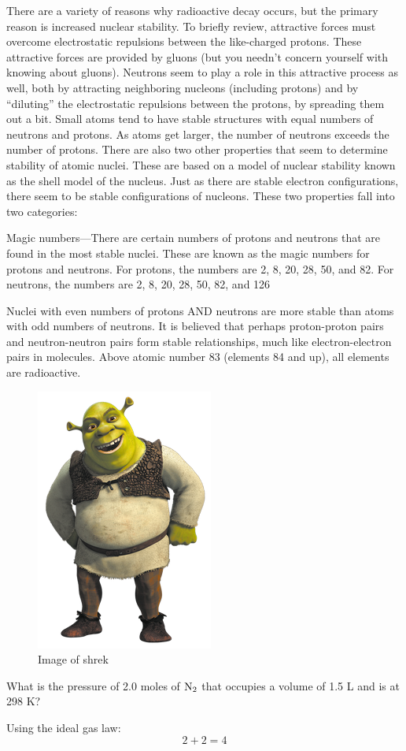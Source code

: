 There are a variety of reasons why radioactive decay occurs, but the primary reason is increased 
nuclear stability. To briefly review, attractive forces must overcome electrostatic repulsions 
between the like-charged protons. These attractive forces are provided by gluons (but you needn’t
concern yourself with knowing about gluons). Neutrons seem to play a role in this attractive 
process as well, both by attracting neighboring nucleons (including protons) and by “diluting” 
the electrostatic repulsions between the protons, by spreading them out a bit. Small atoms tend 
to have stable structures with equal numbers of neutrons and protons. As atoms get larger, the 
number of neutrons exceeds the number of protons. There are also two other properties that seem 
to determine stability of atomic nuclei. These are based on a model of nuclear stability known as 
the shell model of the nucleus. Just as there are stable electron configurations, there seem to be 
stable configurations of nucleons. These two properties fall into two categories:
\begin{enum}
    \item Magic numbers—There are certain numbers of protons and neutrons that are found in the 
        most stable nuclei. These are known as the magic numbers for protons and neutrons. For 
        protons, the numbers are 2, 8, 20, 28, 50, and 82. For neutrons, the numbers are 2, 8, 20,
        28, 50, 82, and 126
    \item Nuclei with even numbers of protons AND neutrons are more stable than atoms with odd 
        numbers of neutrons. It is believed that perhaps proton-proton pairs and neutron-neutron pairs 
        form stable relationships, much like electron-electron pairs in molecules. Above atomic number 
        83 (elements 84 and up), all elements are radioactive.
\end{enum}

\begin{figure}[ht]
    \centering
    \includegraphics[width=0.3 \textwidth ]{../figures/shrek.png}
    \caption{Image of shrek}
    \label{fig:shrek}
\end{figure}

\begin{problems}
    \item What is the pressure of 2.0 moles of $\ch{N2}$ that occupies a volume of 1.5 L and is at 298 K?
\end{problems}
\begin{solutions}
    \item Using the ideal gas law:
        \[
            2+2=4
        \]
\end{solutions}
